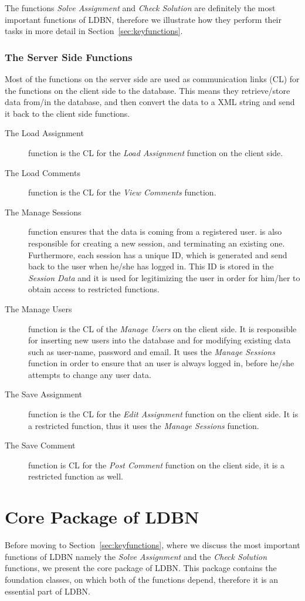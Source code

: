 The functions \textit{Solve Assignment} and \textit{Check Solution} are definitely the most 
important functions of LDBN, therefore we illustrate how they perform their tasks
in more detail in Section~\ref{sec:keyfunctions}. 

\subsubsection{The Server Side Functions}

Most of the functions on the server side are used as communication links (CL) for the
functions on the client side to the database. This means they retrieve/store data from/in the 
database, and then convert the data to a XML string and send it back to the client side
functions. 

\begin{description}
	\item[The Load Assignment] function is the CL for the \textit{Load Assignment} function on the 
		client side.
	\item[The Load Comments] function is the CL for the \textit{View Comments} function.
	\item[The Manage Sessions] function ensures that the data is coming from a registered user.
		is also responsible for creating a new session, and terminating an existing one. Furthermore,
		each session has a unique ID, which is generated and send back to the user 
		when he/she has logged in. This ID is stored in the \textit{Session Data} and it is used for
		legitimizing the user in order for him/her to obtain access to restricted functions.
	\item[The Manage Users] function is the CL of the \textit{Manage Users} on the client side.
		It is responsible 
		for inserting new users into the database and for modifying existing data such as 
		user-name, password and email.
		It uses the \textit{Manage Sessions} function in order to ensure that an 
		user is always logged in, before he/she attempts to change any user data.  
	\item[The Save Assignment] function is the CL for the \textit{Edit Assignment} function on the client side. 
		It is a restricted function, thus it uses the \textit{Manage Sessions} function. 
	\item[The Save Comment] function is CL for the \textit{Post Comment} function on the client side, it is 
		a restricted function as well.
\end{description} 

\section{Core Package of LDBN}
Before moving to Section~\ref{sec:keyfunctions}, where we discuss the most important functions of 
LDBN namely the \textit{Solve Assignment} and the \textit{Check Solution} functions, 
we present the core package of LDBN. This package contains the foundation 
classes, on which both of the functions depend, therefore it is an essential 
part of LDBN. 

